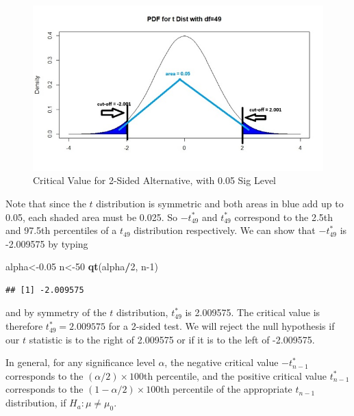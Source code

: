 \documentclass[
]{book}
\newenvironment{Shaded}{\begin{snugshade}}{\end{snugshade}}
\newcommand{\DecValTok}[1]{\textcolor[rgb]{0.00,0.00,0.81}{#1}}
\newcommand{\FloatTok}[1]{\textcolor[rgb]{0.00,0.00,0.81}{#1}}
\newcommand{\FunctionTok}[1]{\textcolor[rgb]{0.13,0.29,0.53}{\textbf{#1}}}
\newcommand{\NormalTok}[1]{#1}
\newcommand{\OtherTok}[1]{\textcolor[rgb]{0.56,0.35,0.01}{#1}}
\newcommand{\SpecialCharTok}[1]{\textcolor[rgb]{0.81,0.36,0.00}{\textbf{#1}}}
\begin{document}
\begin{figure}
\centering
\includegraphics{images/09-crit_2sided.jpeg}
\caption{\label{fig:9-critneq}Critical Value for 2-Sided Alternative, with 0.05 Sig Level}
\end{figure}

Note that since the \(t\) distribution is symmetric and both areas in blue add up to 0.05, each shaded area must be 0.025. So \(-t_{49}^*\) and \(t_{49}^*\) correspond to the 2.5th and 97.5th percentiles of a \(t_{49}\) distribution respectively. We can show that \(-t_{49}^*\) is -2.009575 by typing

\begin{Shaded}
\begin{Highlighting}[]
\NormalTok{alpha}\OtherTok{\textless{}{-}}\FloatTok{0.05}
\NormalTok{n}\OtherTok{\textless{}{-}}\DecValTok{50}
\FunctionTok{qt}\NormalTok{(alpha}\SpecialCharTok{/}\DecValTok{2}\NormalTok{, n}\DecValTok{{-}1}\NormalTok{)}
\end{Highlighting}
\end{Shaded}

\begin{verbatim}
## [1] -2.009575
\end{verbatim}

and by symmetry of the \(t\) distribution, \(t_{49}^*\) is 2.009575. The critical value is therefore \(t_{49}^* = 2.009575\) for a 2-sided test. We will reject the null hypothesis if our \(t\) statistic is to the right of 2.009575 or if it is to the left of -2.009575.

In general, for any significance level \(\alpha\), the negative critical value \(-t_{n-1}^*\) corresponds to the \((\alpha/2) \times 100\)th percentile, and the positive critical value \(t_{n-1}^*\) corresponds to the \((1 - \alpha/2) \times 100\)th percentile of the appropriate \(t_{n-1}\) distribution, if \(H_a: \mu \neq \mu_0\).
\end{document}
